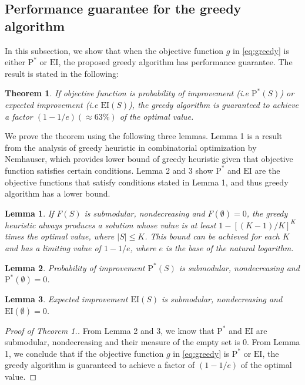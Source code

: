\documentclass[12pt]{article}
\newcommand{\EI}{\mathrm{EI}}
\newcommand{\PI}{\text{P}^*}
\newtheorem{theorem}{Theorem}
\newtheorem{lemma}{Lemma}
\begin{document}
\subsection{Performance guarantee for the greedy algorithm}
In this subsection, we show that when the objective function $g$ in \eqref{eq:greedy} is either $\PI$ or $\EI$, the proposed greedy algorithm has performance guarantee. The result is stated in the following:
\begin{theorem} 
If objective function is probability of improvement (i.e $\PI(S)$) or expected improvement (i.e $\EI(S)$), the greedy algorithm is guaranteed to achieve a factor $(1-1/e) (\approx 63\%)$ of the optimal value.
\end{theorem}
We prove the theorem using the following three lemmas. Lemma 1 is a result from the analysis of greedy heuristic in combinatorial optimization by Nemhauser, which provides lower bound of greedy heuristic given that objective function satisfies certain conditions. Lemma 2 and 3 show $\PI$ and $\EI$ are the objective functions that satisfy conditions stated in Lemma 1, and thus greedy algorithm has a lower bound.
\begin{lemma} \citep{Company1978}
If $F(S)$ is submodular, nondecreasing and $F(\emptyset)=0$, the greedy heuristic always produces a solution whose value is at least $1-[(K-1)/K]^K$ times the optimal value, where $|S| \leq K$. This bound can be achieved for each $K$ and has a limiting value of $1-1/e$, where $e$ is the base of the natural logarithm.
\end{lemma}

\begin{lemma} 
  Probability of improvement $\PI(S)$ is submodular, nondecreasing and $\PI(\emptyset)=0$.
\end{lemma}
\begin{lemma}
  Expected improvement $\EI(S)$ is submodular, nondecreasing and $\EI(\emptyset)=0$.
\end{lemma}

\begin{proof}[Proof of Theorem 1.]
From Lemma 2 and 3, we know that $\PI$ and $\EI$ are submodular, nondecreasing and their measure of the empty set is 0. From Lemma 1, we conclude that if the objective function $g$ in \eqref{eq:greedy} is $\PI$ or $\EI$, the greedy algorithm is guaranteed to achieve a factor of $(1-1/e)$ of the optimal value. \qedhere
\end{proof}
\end{document}
